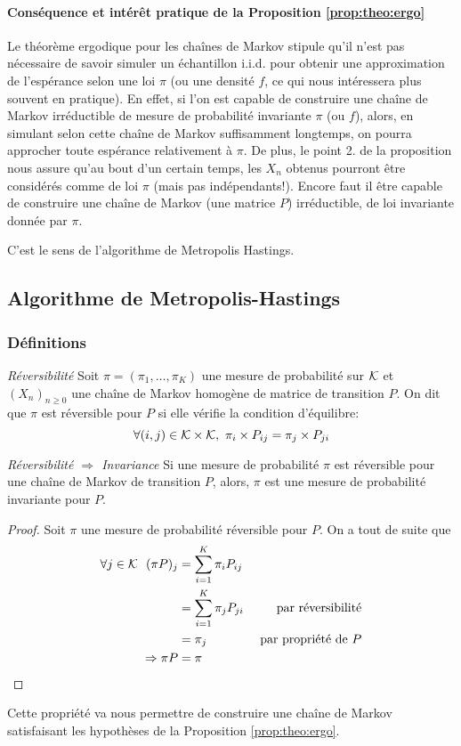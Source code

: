 \paragraph{Conséquence et intérêt pratique de la Proposition \ref{prop:theo:ergo}} Le théorème ergodique pour les chaînes de Markov stipule qu'il n'est pas nécessaire de savoir simuler un échantillon i.i.d. pour obtenir une approximation de l'espérance selon une loi $\pi$ (ou une densité $f$, ce qui nous intéressera plus souvent en pratique). En effet, si l'on est capable de construire une chaîne de Markov irréductible de mesure de probabilité invariante $\pi$ (ou $f$), alors, en simulant selon cette chaîne de Markov suffisamment longtemps, on pourra approcher toute espérance relativement à $\pi$. De plus, le point 2. de la proposition nous assure qu'au bout d'un certain temps, les $X_n$ obtenus pourront être considérés comme de loi $\pi$ (mais pas indépendants!). Encore faut il être capable de construire une chaîne de Markov (une matrice $P$) irréductible, de loi invariante donnée par $\pi$.

C'est le sens de l'algorithme de Metropolis Hastings.

\subsection{Algorithme de Metropolis-Hastings}

\subsubsection{Définitions}

\begin{definition}{\textit{Réversibilité}}
Soit $\pi =(\pi_1,\dots, \pi_K)$ une mesure de probabilité sur $\mathcal{K}$ et $(X_n)_{n\geq 0}$ une chaîne de Markov homogène de matrice de transition $P$. 
On dit que $\pi$ est réversible pour $P$ si elle vérifie la condition d'équilibre:
$$\forall (i, j) \in \mathcal{K}\times \mathcal{K},~\pi_i \times P_{ij} = \pi_j \times P_{ji}$$
\begin{propriete}{\textit{Réversibilité $\Rightarrow$ Invariance}}
\label{prop:Rev:Inv}
Si une mesure de probabilité $\pi$ est réversible pour une chaîne de Markov de transition $P$, alors, $\pi$ est une mesure de probabilité invariante pour $P$.
\end{propriete}
\begin{proof}
Soit $\pi$ une mesure de probabilité réversible pour $P$. On a tout de suite que
\begin{align*}
\forall j \in \mathcal{K}~~(\pi P)_j & = \sum_{i = 1}^{K} \pi_i P_{ij}& \\
&= \sum_{i = 1}^{K} \pi_j P_{ji} &\text{ par réversibilité}\\
&= \pi_j &\text{ par propriété de } P\\
\Rightarrow \pi P &= \pi&
\end{align*}
\end{proof}
Cette propriété va nous permettre de construire une chaîne de Markov satisfaisant les hypothèses de la Proposition \ref{prop:theo:ergo}.
\end{definition}

